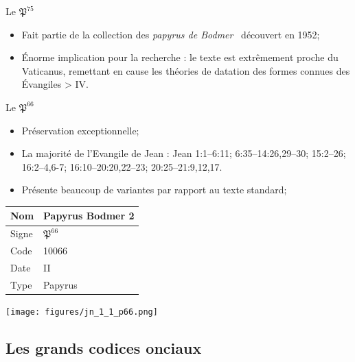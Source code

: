 \documentclass[11pt]{beamer}
\begin{document}
\begin{frame}{Le $\mathfrak{P}^{75}$}

    \begin{itemize}
        \item Fait partie de la collection \og des \textit{papyrus de Bodmer} \fg\ découvert en 1952;
        \item Énorme implication pour la recherche : le texte est extrêmement proche du Vaticanus, remettant en cause les théories de datation des formes connues des Évangiles > IV\ieme{}.
    \end{itemize}
\end{frame}

\begin{frame}{Le $\mathfrak{P}^{66}$}
    \begin{block}{}
        \begin{itemize}
            \item Préservation exceptionnelle;
            \item La majorité de l'Evangile de Jean : Jean 1:1–6:11; 6:35–14:26,29–30; 15:2–26; 16:2–4,6-7; 16:10–20:20,22–23; 20:25–21:9,12,17.
            \item Présente beaucoup de variantes par rapport au texte standard;
        \end{itemize}
    \end{block}
    \vfill

    \begin{minipage}{.45\textwidth}
\begin{tabularx}{\textwidth}{l|X}
    \small
     Nom & Papyrus Bodmer 2 \\
     \hline
     Signe & $\mathfrak{P}^{66}$ \\
     \hline
     Code & 10066\\
     \hline
     Date & II\ieme{} \\
     \hline
     Type & Papyrus \\
\end{tabularx}
\end{minipage}
\hfill
\begin{minipage}{.45\textwidth}
    \texttt{[image: figures/jn\_1\_1\_p66.png]}
\end{minipage}
\end{frame}


\subsection{Les grands codices onciaux}
\end{document}
